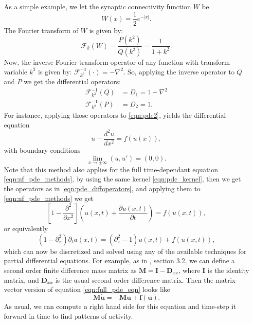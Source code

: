 \documentclass{uonmathreport}
\begin{document}
As a simple example, we let the synaptic connectivity function $W$ be
\begin{equation}\label{eqn:pde_kernel}
W(x) = \frac{1}{2} e^{-|x|}.
\end{equation}
The Fourier transform of $W$ is given by:
\begin{equation}
\mathcal{F}_k(W) = \frac{P(k^2)}{Q(k^2)} = \frac{1}{1 + k^2}.
\end{equation}
Now, the inverse Fourier transform operator of any function with transform variable $k^2$ is given by: $\mathcal{F}^{-1}_{k^2}(\cdot) = - \nabla^2$. So, applying the inverse operator to $Q$ and $P$ we get the differential operators:
\begin{subequations} \label{eqn:pde_diffoperators}
	\begin{align}
	\mathcal{F}^{-1}_{k^2}(Q) &= D_1 = 1 - \nabla ^ 2 \\
	\mathcal{F}^{-1}_{k^2}(P) &= D_2 = 1.
	\end{align}
\end{subequations}
For instance, applying those operators to \ref{eqn:pde2}, yields the differential equation
\begin{equation}
u - \frac{d^2 u}{d x^2} = 
f(u(x)),
\end{equation}
with boundary conditions
\begin{equation}
\lim\limits_{x \rightarrow \pm \infty}(u, u') = (0,0).
\end{equation}
Note that this method also applies for the full time-dependant equation \ref{eqn:nf_pde_methods}, by using the same kernel \ref{eqn:pde_kernel}, then we get the operators as in \ref{eqn:pde_diffoperators}, and applying them to \ref{eqn:nf_pde_methods} we get
\begin{equation}
\left[1 - \frac{\partial^2}{\partial x^2} \right] \left(u(x,t) + \frac{\partial u(x,t)}{\partial t}\right) = f(u(x,t)),
\end{equation}
or equivalently
\begin{equation}\label{eqn:full_pde_eqn}
(1-\partial_x^2)\partial_t u(x,t) = (\partial_x^2 - 1)u(x,t) + f(u(x,t)),
\end{equation}
which can now be discretized and solved using any of the available techniques for partial differential equations. For example, as in \cite{rankin2014continuation}, section 3.2, we can define a second order finite difference mass matrix as $\mathbf{M} = \mathbf{I} - \mathbf{D}_{xx}$, where $\mathbf{I}$ is the identity matrix, and $\mathbf{D}_{xx}$ is the usual second order difference matrix. Then the matrix-vector version of equation \ref{eqn:full_pde_eqn} looks like
\begin{equation}
\mathbf{M} \dot{\mathbf{u}} = - \mathbf{M} \mathbf{u} + \mathbf{f}(\mathbf{u}).
\end{equation}
As usual, we can compute a right hand side for this equation and time-step it forward in time to find patterns of activity.
\end{document}
